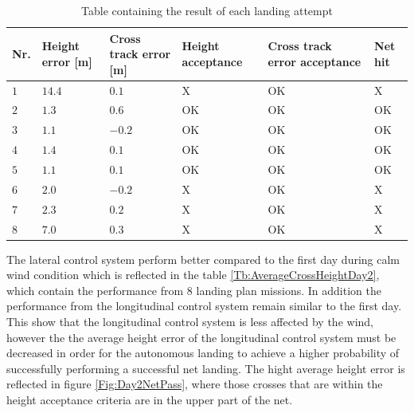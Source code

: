 \begin{table}[H]
\centering
\begin{tabular}{| p{0.5cm} | p{1cm} | p{1cm} | p{3.5cm} | p{3cm} | p{1cm} |}
\hline
\textbf{Nr.}	& \textbf{Height error [m]}	& \textbf{Cross track error [m]}& \textbf{Height acceptance}& \textbf{Cross track error acceptance}	& \textbf{Net hit}\\ \hline
$1$				& $14.4$		& $0.1$		& X								& OK									& X					\\ \hline
$2$				& $1.3$		& $0.6$	& OK								& OK										& OK					\\ \hline
$3$				& $1.1$		& $-0.2$	& OK							& OK									& OK				\\ \hline
$4$				& $1.4$		& $0.1$		& OK							& OK										& OK					\\ \hline
$5$				& $1.1$		& $0.1$		& OK							& OK										& OK					\\ \hline
$6$				& $2.0$		& $-0.2$	& X								& OK									& X					\\ \hline
$7$				& $2.3$		& $0.2$		& X								& OK									& X				\\ \hline
$8$				& $7.0$	& $0.3$	& X										& OK										& X					\\ \hline
\end{tabular}
\caption{Table containing the result of each landing attempt}
\label{tb:Day2LandingAttempt}
\end{table}
The lateral control system perform better compared to the first day during calm wind condition which is reflected in the table \ref{Tb:AverageCrossHeightDay2}, which contain the performance from 8 landing plan missions. In addition the performance from the longitudinal control system remain similar to the first day. This show that the longitudinal control system is less affected by the wind, however the the average height error of the longitudinal control system must be decreased in order for the autonomous landing to achieve a higher probability of successfully performing a successful net landing. The hight average height error is reflected in figure \ref{Fig:Day2NetPass}, where those crosses that are within the height acceptance criteria are in the upper part of the net.
